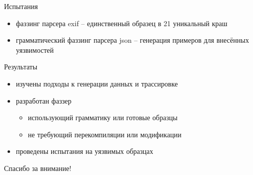 \documentclass[hyperref={unicode=true}, 12pt]{beamer}
\begin{document}
	\begin{frame}[c]{Испытания}
		
		\begin{itemize}
			\item фаззинг парсера exif -- единственный образец в 21 уникальный краш
			
			\item грамматический фаззинг парсера json -- генерация примеров для внесённых уязвимостей
		\end{itemize}
		
		\vspace{0.6cm}
		
	\end{frame}

	\begin{frame}[c]{Результаты}
		
		\begin{itemize}
			\item изучены подходы к генерации данных и трассировке
			
			\item разработан фаззер
			\begin{itemize}
				\fontsize{11}{15}\selectfont
				\item использующий грамматику или готовые образцы
				\item не требующий перекомпиляции или модификации
			\end{itemize}
			\item проведены испытания на уязвимых образцах
		\end{itemize}
	
	\end{frame}

	\begin{frame}[c]
		\fontsize{26}{24}\selectfont
		\centering Спасибо за внимание!
	\end{frame}
	
\end{document}
